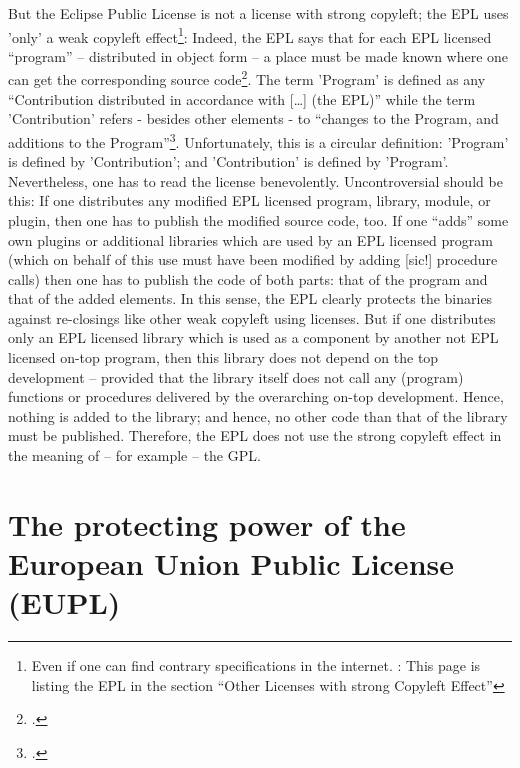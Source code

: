 But the Eclipse Public License is not a license with strong copyleft; the EPL
uses 'only' a weak copyleft effect\footnote{Even if one can find contrary
specifications in the internet. \cite[Pars pro toto cf.][\nopage wp
]{ifross2011a}: This page is listing the EPL in the section \enquote{Other
Licenses with strong Copyleft Effect}}: Indeed, the EPL says that for each EPL
licensed \enquote{program} -- distributed in object form -- a place must be made
known where one can get the corresponding source code\footcite[cf.][\nopage wp
§3, esp. §3.b.iv]{Epl10OsiLicense2005a}. The term 'Program' is defined as any
\enquote{Contribution distributed in accordance with [\ldots] (the EPL)} while
the term 'Contribution' refers - besides other elements - to \enquote{changes to
the Program, and additions to the Program}\footcite[cf.][\nopage wp
§1]{Epl10OsiLicense2005a}. Unfortunately, this is a circular definition:
'Program' is defined by 'Contribution'; and 'Contribution' is defined by
'Program'. Nevertheless, one has to read the license benevolently.
Uncontroversial should be this: If one distributes any modified EPL licensed
program, library, module, or plugin, then one has to publish the modified source
code, too. If one \enquote{adds} some own plugins or additional libraries which
are used by an EPL licensed program (which on behalf of this use must have been
modified by adding [sic!] procedure calls) then one has to publish the code of
both parts: that of the program and that of the added elements. In this sense,
the EPL clearly protects the binaries against re-closings like other weak
copyleft using licenses. But if one distributes only an EPL licensed library
which is used as a component by another not EPL licensed on-top program, then
this library does not depend on the top development -- provided that the library
itself does not call any (program) functions or procedures delivered by the
overarching on-top development. Hence, nothing is added to the library; and
hence, no other code than that of the library must be published. Therefore, the
EPL does not use the strong copyleft effect in the meaning of -- for example --
the GPL.
 
\section{The protecting power of the European Union Public License (EUPL)}
\label{sec:ProtectingPowerOfEupl}

